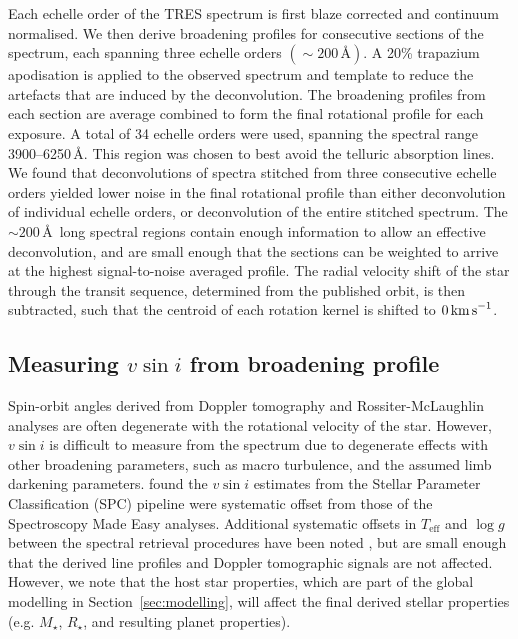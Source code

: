 \documentclass[useAMS,usenatbib]{mn2e}
\newcommand{\teff}{$T_\text{eff}$\xspace}
\newcommand{\logg}{$\log g$\xspace}
\begin{document}
Each echelle order of the TRES spectrum is first blaze corrected and continuum normalised. We then derive broadening profiles for consecutive sections of the spectrum, each spanning three echelle orders $(\sim 200\,\text{\AA})$. A 20\% trapazium apodisation is applied to the observed spectrum and template to reduce the artefacts that are induced by the deconvolution. The broadening profiles from each section are average combined to form the final rotational profile for each exposure. A total of 34 echelle orders were used, spanning the spectral range 3900--6250\,\AA. This region was chosen to best avoid the telluric absorption lines. We found that deconvolutions of spectra stitched from three consecutive echelle orders yielded lower noise in the final rotational profile than either deconvolution of individual echelle orders, or deconvolution of the entire stitched spectrum. The $\sim 200\,$\AA\, long spectral regions contain enough information to allow an effective deconvolution, and are small enough that the sections can be weighted to arrive at the highest signal-to-noise averaged profile. The radial velocity shift of the star through the transit sequence, determined from the published orbit, is then subtracted, such that the centroid of each rotation kernel is shifted to $0\,\text{km\,s}^{-1}$.

\subsection{Measuring $v\sin i$ from broadening profile}
\label{sec:vsini}
Spin-orbit angles derived from Doppler tomography and Rossiter-McLaughlin analyses are often degenerate with the rotational velocity of the star. However, $v \sin i$ is difficult to measure from the spectrum due to degenerate effects with other broadening parameters, such as macro turbulence, and the assumed limb darkening parameters. \citet{2012ApJ...757..161T} found the $v\sin i$ estimates from the Stellar Parameter Classification (SPC) pipeline \citep[used in the discovery papers,] []{2012Natur.486..375B} were systematic offset from those of the Spectroscopy Made Easy \citep[SME][]{1996A&amp;AS..118..595V} analyses. Additional systematic offsets in \teff and \logg between the spectral retrieval procedures have been noted \cite[e.g.][]{2012ApJ...757..161T,2013A&A...558A.106M}, but are small enough that the derived line profiles and Doppler tomographic signals are not affected. However, we note that the host star properties, which are part of the global modelling in Section~\ref{sec:modelling}, will affect the final derived stellar properties (e.g. $M_\star$, $R_\star$, and resulting planet properties). 
\end{document}
